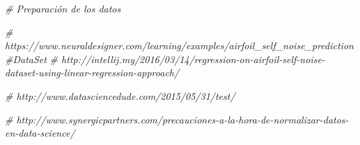 \documentclass[]{article}
\newenvironment{Shaded}{\begin{snugshade}}{\end{snugshade}}
\newcommand{\CommentTok}[1]{\textcolor[rgb]{0.56,0.35,0.01}{\textit{#1}}}
\begin{document}
\begin{Shaded}
\begin{Highlighting}[]
\CommentTok{# Preparación de los datos}

\CommentTok{# https://www.neuraldesigner.com/learning/examples/airfoil_self_noise_prediction#DataSet}
\CommentTok{# http://intellij.my/2016/03/14/regression-on-airfoil-self-noise-dataset-using-linear-regression-approach/}

\CommentTok{# http://www.datasciencedude.com/2015/05/31/test/}

\CommentTok{# http://www.synergicpartners.com/precauciones-a-la-hora-de-normalizar-datos-en-data-science/}
\end{Highlighting}
\end{Shaded}
\end{document}
